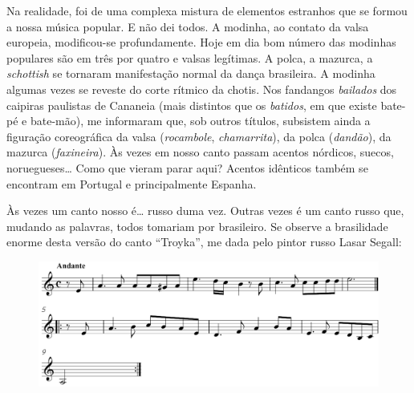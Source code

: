 Na realidade, foi de uma complexa mistura de elementos estranhos que se
formou a nossa música popular. E não dei todos. A modinha, ao contato da
valsa europeia, modificou-se profundamente. Hoje em dia bom número das
modinhas populares são em três por quatro e valsas legítimas. A polca, a
mazurca, a \textit{schottish} se tornaram manifestação normal da dança
brasileira. A modinha algumas vezes se reveste do corte rítmico da
chotis. Nos fandangos \textit{bailados} dos caipiras paulistas de Cananeia
(mais distintos que os \textit{batidos}, em que existe bate-pé e bate-mão),
me informaram que, sob outros títulos, subsistem ainda a figuração
coreográfica da valsa (\textit{rocambole}, \textit{chamarrita}), da polca (\textit{dandão}), da
mazurca (\textit{faxineira}). Às vezes em nosso canto passam acentos nórdicos,
suecos, noruegueses\ldots{} Como que vieram parar aqui? Acentos idênticos
também se encontram em Portugal e principalmente Espanha.

Às vezes um canto nosso é\ldots{} russo duma vez. Outras vezes é um canto
russo que, mudando as palavras, todos tomariam por brasileiro. Se
observe a brasilidade enorme desta versão do canto ``Troyka'', me dada
pelo pintor russo Lasar Segall:

 \begin{figure}[H]
 \includegraphics[width=\textwidth]{./imgs/fig5.pdf}
 \end{figure}

